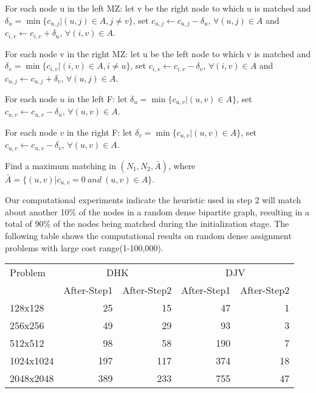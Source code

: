 \vskip 5pt

\begin{enumerate}
{\small\it

\item For each node u in the left MZ: 
let v be the right node to which u is matched and 
$\delta_u =\min \{ c_{u,j}|(u,j)\in A, j\not= v\}$, 
set $c_{u,j} \leftarrow c_{u,j} - \delta_u$, $\forall (u,j)\in A$ and
$c_{i,v} \leftarrow c_{i,v} + \delta_u$, $\forall (i,v)\in A$.

\item For each node v in the right MZ: 
let u be the left node to which v is matched and 
$\delta_v =\min \{ c_{i,v}|(i,v)\in A, i\not= u\}$, 
set $c_{i,v} \leftarrow c_{i,v} - \delta_v$, $\forall (i,v)\in A$ and
$c_{u,j} \leftarrow c_{u,j} + \delta_v$, $\forall (u,j)\in A$.

\item For each node $u$ in the left F: 
let $\delta_u
=\min \{ c_{u,v}|(u,v)\in A\}$, set $c_{u,v} \leftarrow c_{u,v} - \delta_u$,
$\forall (u,v)\in A$.

\item For each node $v$ in the right F: 
let $\delta_v
=\min \{ c_{u,v}|(u,v)\in A\}$, set $c_{u,v} \leftarrow c_{u,v} - \delta_v$,
$\forall (u,v)\in A$.


\item Find a maximum matching in $(N_1,N_2,\bar A)$, where
$\bar A =\{(u,v)|c_{u,v} = 0\ and\ (u,v)\in A\}$.
}
\end{enumerate}
\vskip 5pt

Our computational experiments indicate the heuristic used in step 2
will match about another 10\% of the nodes in a random dense bipartite
graph, resulting in a total of 90\% of the nodes being matched during
the initialization stage. The following table shows the computational
results on random dense assignment problems with large cost range(1-100,000).


\vskip 5pt
{\small
\begin{tabular}{|l|rr|rr|} \hline
 Problem & \multicolumn{2}{c|}{DHK}& \multicolumn{2}{c|}{DJV}\\
&After-Step1 &After-Step2 &After-Step1 &After-Step2\\ \hline
128x128& 25& 15& 47& 1\\ 
256x256& 49& 29& 93& 3\\ 
512x512& 98& 58& 190& 7\\ 
1024x1024& 197& 117& 374& 18\\ 
2048x2048& 389& 233& 755& 47\\ \hline
\end{tabular}
}

